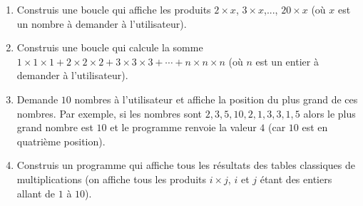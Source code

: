 \documentclass[class=report,crop=false, 12pt]{standalone}
\begin{document}
\bigskip

\begin{activite}
\sauteligne
\begin{enumerate}
  \item Construis une boucle qui affiche les produits $2\times x$, $3\times x$,..., $20 \times x$ (où $x$ est un nombre à demander à l'utilisateur).
     
  \item Construis une boucle qui calcule la somme $1\times 1 \times 1 + 2\times 2 \times 2 + 3\times 3 \times 3 + \cdots
+ n \times n \times n$ (où $n$ est un entier à demander à l'utilisateur).  
  
  \item Demande $10$ nombres à l'utilisateur et affiche la position du plus grand de ces nombres.
  Par exemple, si les nombres sont $2,3,5,10,2,1,3,3,1,5$ alors le plus grand nombre est $10$ et le programme renvoie la valeur $4$ (car $10$ est en quatrième position). 
  
  \item Construis un programme qui affiche tous les résultats des tables classiques de multiplications
  (on affiche tous les produits $i \times j$, $i$ et $j$ étant des entiers allant de $1$ à $10$).
  
\end{enumerate}

\end{activite}
\end{document}
